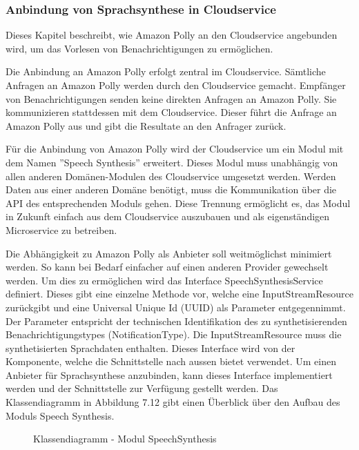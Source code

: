 \subsubsection{Anbindung von Sprachsynthese in Cloudservice}

Dieses Kapitel beschreibt, wie Amazon Polly an den Cloudservice angebunden wird, um das Vorlesen von Benachrichtigungen zu ermöglichen.

Die Anbindung an Amazon Polly erfolgt zentral im Cloudservice.
Sämtliche Anfragen an Amazon Polly werden durch den Cloudservice gemacht.
Empfänger von Benachrichtigungen senden keine direkten Anfragen an Amazon Polly.
Sie kommunizieren stattdessen mit dem Cloudservice.
Dieser führt die Anfrage an Amazon Polly aus und gibt die Resultate an den Anfrager zurück.

Für die Anbindung von Amazon Polly wird der Cloudservice um ein Modul mit dem Namen ''Speech Synthesis'' erweitert.
Dieses Modul muss unabhängig von allen anderen Domänen-Modulen des Cloudservice umgesetzt werden.
Werden Daten aus einer anderen Domäne benötigt, muss die Kommunikation über die API des entsprechenden Moduls gehen.
Diese Trennung ermöglicht es, das Modul in Zukunft einfach aus dem Cloudservice auszubauen und als eigenständigen Microservice zu betreiben.

Die Abhängigkeit zu Amazon Polly als Anbieter soll weitmöglichst minimiert werden.
So kann bei Bedarf einfacher auf einen anderen Provider gewechselt werden.
Um dies zu ermöglichen wird das Interface SpeechSynthesisService definiert.
Dieses gibt eine einzelne Methode vor, welche eine InputStreamResource zurückgibt und eine Universal Unique Id (UUID) als Parameter entgegennimmt.
Der Parameter entspricht der technischen Identifikation des zu synthetisierenden Benachrichtigungstypes (NotificationType).
Die InputStreamResource muss die synthetisierten Sprachdaten enthalten.
Dieses Interface wird von der Komponente, welche die Schnittstelle nach aussen bietet verwendet.
Um einen Anbieter für Sprachsynthese anzubinden, kann dieses Interface implementiert werden und der Schnittstelle zur Verfügung gestellt werden.
Das Klassendiagramm in Abbildung 7.12 gibt einen Überblick über den Aufbau des Moduls Speech Synthesis.

\begin{figure}[h]
    \centering
    \begin{minipage}[b]{1\textwidth}
        \caption{Klassendiagramm - Modul SpeechSynthesis}
    \end{minipage}
\end{figure}

